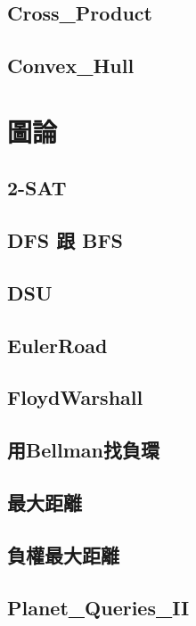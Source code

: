 \subsection{Cross_Product} 

\subsection{Convex_Hull} 


\section{圖論}
\subsection{2-SAT} 

\subsection{DFS 跟 BFS} 

\subsection{DSU} 

\subsection{EulerRoad} 

\subsection{FloydWarshall} 

\subsection{用Bellman找負環} 

\subsection{最大距離} 

\subsection{負權最大距離} 

\subsection{Planet_Queries_II} 


